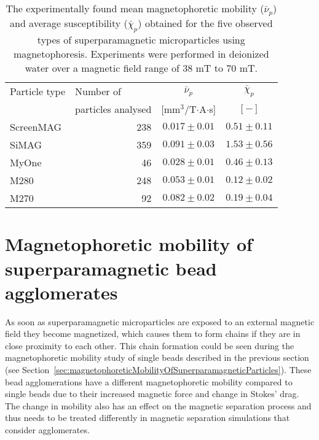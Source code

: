 \begin{table}[htb]
\begin{center}
\caption[Experimentally found averaged magnetophoretic mobility and susceptibility of superparamagnetic particles using magnetophoresis]{The experimentally found mean magnetophoretic mobility ($\bar{\nu}_{p}$) and average susceptibility ($\bar{\chi}_{p}$) obtained for the five observed types of superparamagnetic microparticles using magnetophoresis. Experiments were performed in deionized water over a magnetic field range of $38$ mT to $70$ mT.}\vspace{1ex}
\label{tab:particleMobility}
\begin{tabular}{lrcc}\hline
Particle type 		& \multicolumn{1}{l}{Number of} 		& $\bar{\nu}_{p}$ 			& $\bar{\chi}_{p}$ \\ 
					& \multicolumn{1}{l}{particles analysed}&[mm$^3$/T$\cdot$A$\cdot$s]	& $[-]$ \\ 
\hline
ScreenMAG		& 238 	& $0.017\pm 0.01$ 			& $0.51\pm 0.11$ \\
SiMAG		 		& 359 	& $0.091\pm 0.03$ 			& $1.53\pm 0.56$ \\
MyOne 	 			& 46 	& $0.028\pm 0.01$ 			& $0.46\pm 0.13$ \\
M280 				& 248 	& $0.053\pm 0.01$ 			& $0.12\pm 0.02$ \\
M270 				& 92 	& $0.082\pm 0.02$ 			& $0.19\pm 0.04$ \\ 
\hline
\end{tabular}
\end{center}
\end{table}

\section{Magnetophoretic mobility of superparamagnetic bead agglomerates}\label{sec:magnetophoreticMobilityOfSuperparamagneticAgglomerates}
As soon as superparamagnetic microparticles are exposed to an external magnetic field they become magnetized, which causes them to form chains if they are in close proximity to each other. This chain formation could be seen during the magnetophoretic mobility study of single beads described in the previous section (see Section~\ref{sec:magnetophoreticMobilityOfSuperparamagneticParticles}). These bead agglomerations have a different magnetophoretic mobility compared to single beads due to their increased magnetic force and change in Stokes' drag. The change in mobility also has an effect on the magnetic separation process and thus needs to be treated differently in magnetic separation simulations that consider agglomerates.

